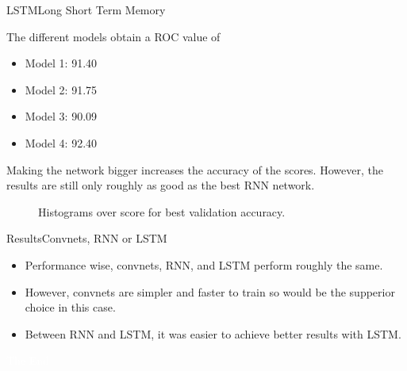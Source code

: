 \documentclass{beamer}
\newlength\figureheight
\newlength\figurewidth
\begin{document}
\begin{frame}{LSTM}{Long Short Term Memory}
	\noindent
\begin{minipage}{0.45\textwidth}%
	The different models obtain a ROC value of 
	\begin{itemize}%
		\item Model 1: 91.40
		\item Model 2: 91.75
		\item Model 3: 90.09
		\item Model 4: 92.40
	\end{itemize}
	Making the network bigger increases the accuracy of the scores. However,
        the results are still only roughly as good as the best RNN network.
\end{minipage} \hfill
\begin{minipage}{0.45\textwidth}%
	\begin{figure}
		\centering
		
		\setlength\figureheight{3cm}
		\setlength{}
		
		
		\caption{Histograms over score for best validation accuracy.} 
	\end{figure}
\end{minipage}
\end{frame}




\begin{frame}{Results}{Convnets, RNN or LSTM}
  \begin{itemize}

  \item Performance wise, convnets, RNN, and LSTM perform roughly the same.

  \item However, convnets are simpler and faster to train so would be the
    supperior choice in this case.

  \item Between RNN and LSTM, it was easier to achieve better results with LSTM.

  \end{itemize}

\end{frame}

\bgroup
{}
\begin{frame}[t,plain]{}{}
  \begin{center}
    {\tiny \textcolor{white}{The End}}
  \end{center}
\end{frame}
\egroup
\end{document}
